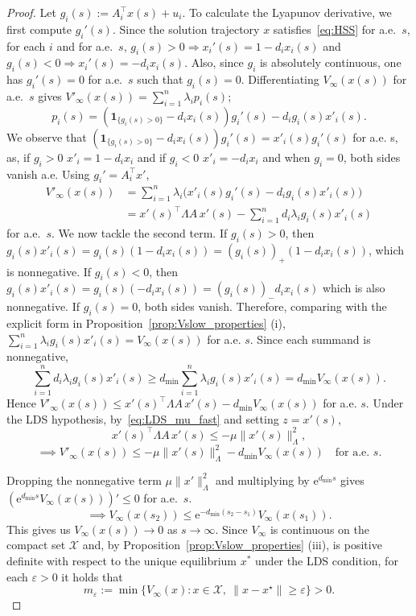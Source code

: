 \documentclass[letterpaper, conference]{ieeeconf}
\newcommand{\X}{\mathcal X}
\newcommand{\1}{\mathbf{1}}
\begin{document}
\begin{proof}
Let \(g_i(s):= A_i^\top x(s)+u_i\).
To calculate the Lyapunov derivative, we first compute \(g_i'(s)\).
Since the solution trajectory \(x\) satisfies~\eqref{eq:HSS} for a.e.\ \(s\), for each \(i\) and for a.e.\ \(s\), \(g_i(s)>0 \Longrightarrow x_i'(s)=1-d_i x_i(s)\) and \(g_i(s)<0 \Longrightarrow x_i'(s)=-d_i x_i(s)\).
Also, since \(g_i\) is absolutely continuous, one has \(g_i'(s)=0\) for a.e.\ \(s\) such that \(g_i(s) = 0\). Differentiating \(V_\infty(x(s))\) for a.e.\ \(s\) gives
\(V'_\infty(x(s)) = \sum_{i=1}^n \lambda_i p_i(s)\); 
\[p_i(s) = \left(\mathbf 1_{\{g_i(s)>0\}}-d_i x_i(s)\right)g_i'(s)-d_i g_i(s) x'_i(s).\]
We observe that \((\mathbf 1_{\{g_i(s)>0\}}-d_i x_i(s)) g_i'(s) = x'_i(s) g_i'(s)\) for a.e. s, as, if \(g_i>0\) \(x'_i=1-d_i x_i\) and if \(g_i<0\) \(x'_i=-d_i x_i\) and when \(g_i=0\), both sides vanish a.e.
Using \(g_i'=A_i^\top x'\),
\begin{align*}
    V'_\infty(x(s))
    &=
    \sum_{i=1}^n \lambda_i\bigl(x'_i(s) g_i'(s)-d_i g_i(s) x'_i(s)\bigr)\\
    &=
    x'(s)^\top\Lambda A\, x'(s)
    -
    \sum_{i=1}^n d_i\lambda_i g_i(s)x'_i(s)
\end{align*}
for a.e.\ \(s\).
We now tackle the second term. If \(g_i(s)>0\), then \(g_i(s)x'_i(s)=g_i(s)(1-d_i x_i(s))=(g_i(s))_+(1-d_i x_i(s))\), which is nonnegative. 
If \(g_i(s)<0\), then \(g_i(s) x'_i(s)=g_i(s)(-d_i x_i(s))=(g_i(s))_-d_i x_i(s)\) which is also nonnegative. 
If \(g_i(s)=0\), both sides vanish. 
Therefore, comparing with the explicit form in Proposition~\ref{prop:Vslow_properties} (i), \(\sum_{i=1}^n \lambda_i g_i(s) x'_i(s)=V_\infty(x(s))\) for a.e. \(s\).
Since each summand is nonnegative,
\[
\sum_{i=1}^n d_i\lambda_i g_i(s) x'_i(s)
\ge
d_{\min}\sum_{i=1}^n \lambda_i g_i(s) x'_i(s)
=
d_{\min}V_\infty(x(s)).
\]
Hence \(V'_\infty(x(s)) \le x'(s)^\top\Lambda A\, x'(s)-d_{\min}V_\infty(x(s))\) for a.e. \(s\).
Under the LDS hypothesis, by~\eqref{eq:LDS_mu_fast} and setting \(z = x'(s)\),
\[
x'(s)^\top\Lambda A\, x'(s)
\le -\mu \lVert x'(s)\rVert_\Lambda^2,
\]
\[ \implies
V'_\infty(x(s))
\le
-\mu \lVert x'(s)\rVert_\Lambda^2-d_{\min}V_\infty(x(s))
\quad\text{for a.e.\ }s.
\]

Dropping the nonnegative term \(\mu\lVert x'\rVert_\Lambda^2\) and multiplying by \(\mathrm{e}^{d_{\min} s}\) gives
\(\left(\mathrm{e}^{d_{\min} s}V_\infty(x(s))\right)'\le 0\) for a.e.\ \(s\).
\[\implies V_\infty(x(s_2))\le \mathrm{e}^{-d_{\min}(s_2-s_1)}V_\infty(x(s_1)).\]
This gives us \(V_\infty(x(s))\to0\) as \(s\to\infty\).
Since \(V_\infty\) is continuous on the compact set \(\X\) and, by Proposition~\ref{prop:Vslow_properties} (iii), is positive definite with respect to the unique equilibrium \(x^*\) under the LDS condition, for each \(\varepsilon>0\) it holds that
\[m_\varepsilon := \min\{V_\infty(x):x\in\X,\ \lVert x-x^\star\rVert\ge\varepsilon\} > 0.\]


\end{proof}
\end{document}
